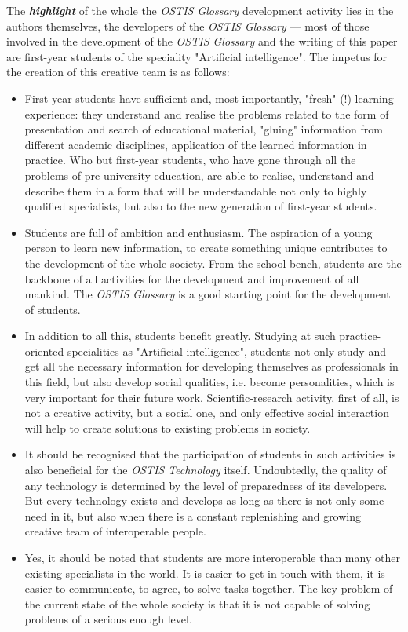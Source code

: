 \documentclass[12pt,a4paper]{scndocument}
\begin{document}
\begin{multicols}{2}
The \textbf{\textit{\underline{highlight}}} of the whole the \textit{OSTIS Glossary} development activity lies in the authors themselves, the developers of the \textit{OSTIS Glossary} — most of those involved in the development of the \textit{OSTIS Glossary} and the writing of this paper are first-year students of the speciality "Artificial intelligence". The impetus for the creation of this creative team is as follows:
\begin{itemize}
\item First-year students have sufficient and, most importantly, "fresh" (!) learning experience: they understand and realise the problems related to the form of presentation and search of educational material, "gluing" information from different academic disciplines, application of the learned information in practice. Who but first-year students, who have gone through all the problems of pre-university education, are able to realise, understand and describe them in a form that will be understandable not only to highly qualified specialists, but also to the new generation of first-year students.
\item Students are full of ambition and enthusiasm. The aspiration of a young person to learn new information, to create something unique contributes to the development of the whole society. From the school bench, students are the backbone of all activities for the development and improvement of all mankind. The \textit{OSTIS Glossary} is a good starting point for the development of students.
\item In addition to all this, students benefit greatly. Studying at such practice-oriented specialities as "Artificial intelligence", students not only study and get all the necessary information for developing themselves as professionals in this field, but also develop social qualities, i.e. become personalities, which is very important for their future work. Scientific-research activity, first of all, is not a creative activity, but a social one, and only effective social interaction will help to create solutions to existing problems in society.
\item It should be recognised that the participation of students in such activities is also beneficial for the \textit{OSTIS Technology} itself. Undoubtedly, the quality of any technology is determined by the level of preparedness of its developers. But every technology exists and develops as long as there is not only some need in it, but also when there is a constant replenishing and growing creative team of interoperable people.
\item Yes, it should be noted that students are more interoperable than many other existing specialists in the world. It is easier to get in touch with them, it
\newpage
is easier to communicate, to agree, to solve tasks together. The key problem of the current state of the whole society is that it is not capable of solving problems of a serious enough level.
\end{itemize}



\end{multicols}
\end{document}
